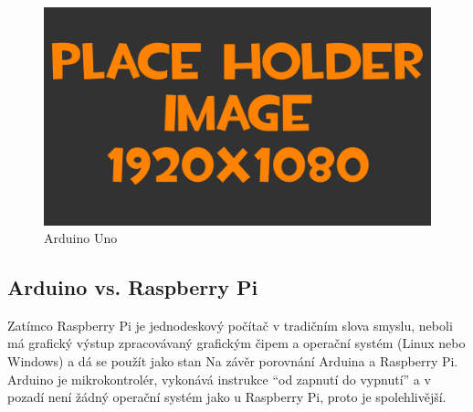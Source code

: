 \begin{figure}[h!]
	\centering
	\includegraphics[width=\textwidth]{pictures/placeHolderFHD.png}
    	\caption{Arduino Uno}
   	\label{fig:arduinoUno}
\end{figure}	

\subsection{Arduino vs. Raspberry Pi}
Zatímco Raspberry Pi je jednodeskový počítač v tradičním slova smyslu, neboli má grafický výstup zpracovávaný grafickým čipem a operační systém (Linux nebo Windows) a dá se použít jako stan
Na závěr porovnání Arduina a Raspberry Pi. Arduino je mikrokontrolér, vykonává instrukce “od zapnutí do vypnutí” a v pozadí není žádný operační systém jako u Raspberry Pi, proto je spolehlivější.